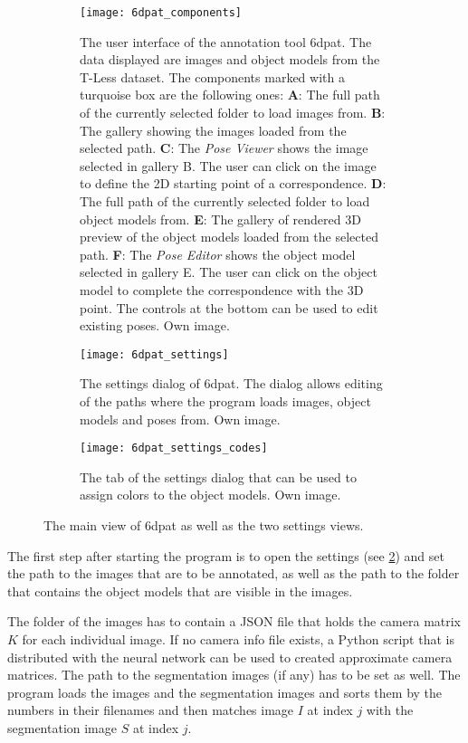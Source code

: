 \begin{figure}[!tbp]
	\centering
	\begin{subfigure}[t]{\textwidth}
		\centering
    	\texttt{[image: 6dpat\_components]}
    	\caption{The user interface of the annotation tool \gls{6dpat}. The data displayed are images and object models from the T-Less dataset. The components marked with a turquoise box are the following ones: \textbf{A}: The full path of the currently selected folder to load images from. \textbf{B}: The gallery showing the images loaded from the selected path. \textbf{C}: The \textit{Pose Viewer} shows the image selected in gallery B. The user can click on the image to define the 2D starting point of a correspondence. \textbf{D}: The full path of the currently selected folder to load object models from. \textbf{E}: The gallery of rendered 3D preview of the object models loaded from the selected path. \textbf{F}: The \textit{Pose Editor} shows the object model selected in gallery E. The user can click on the object model to complete the correspondence with the 3D point. The controls at the bottom can be used to edit existing poses. Own image.}
    	\label{fig:6dpat_components}
	\end{subfigure}
	\par\bigskip
	\begin{subfigure}[t]{0.47\textwidth}
		\centering
    	\texttt{[image: 6dpat\_settings]}
    	\caption{The settings dialog of \gls{6dpat}. The dialog allows editing of the paths where the program loads images, object models and poses from. Own image.}
    	\label{fig:6dpat_settings}
	\end{subfigure}
	\hfill
	\begin{subfigure}[t]{0.47\textwidth}
	\centering
    	\texttt{[image: 6dpat\_settings\_codes]}
    	\caption{The tab of the settings dialog that can be used to assign colors to the object models. Own image.}
    	\label{fig:6dpat_settings_codes}
	\end{subfigure}
	\caption{The main view of \gls{6dpat} as well as the two settings views.}
	\label{fig:6dpat_ui_overview}
\end{figure}

The first step after starting the program is to open the settings (see \fig \ref{fig:6dpat_settings}) and set the path to the images that are to be annotated, as well as the path to the folder that contains the object models that are visible in the images. 

The folder of the images has to contain a JSON file that holds the camera matrix $K$ for each individual image. If no camera info file exists, a Python script that is distributed with the neural network can be used to created approximate camera matrices. The path to the segmentation images (if any) has to be set as well. The program loads the images and the segmentation images and sorts them by the numbers in their filenames and then matches image $I$ at index $j$ with the segmentation image $S$ at index $j$. 

